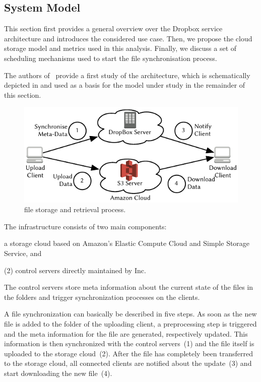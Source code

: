 \subsection{System Model}\label{sec:application:cloud_file_synchronisation:system_model}
This section first provides a general overview over the Dropbox service architecture and introduces the considered use case.
Then, we propose the cloud storage model and metrics used in this analysis.
Finally, we discuss a set of scheduling mechanisms used to start the file synchronisation process. 

The authors of~\cite{Drago2012} provide a first study of the \dropbox architecture, which is schematically depicted in  and used as a basis for the model under study in the remainder of this section.

\begin{figure}
  \centering
  \includegraphics[width=\columnwidth]{application/cloud_file_synchronization/system_model/figures/dropbox_architecture}
  \caption{\dropbox file storage and retrieval process.}
  \label{fig:application:cloud_file_synchronisation:system_model:dropbox_architecture}
\end{figure}

The \dropbox infrastructure consists of two main components:
\begin{enumerate*}
\item a storage cloud based on Amazon's Elastic Compute Cloud and Simple Storage Service, and 
\item (2) control servers directly maintained by \dropbox Inc. 
\end{enumerate*}
The control servers store meta information about the current state of the files in the \dropbox folders and trigger synchronization processes on the clients.

A file synchronization can basically be described in five steps.
As soon as the new file is added to the \dropbox folder of the uploading client, a preprocessing step is triggered and the meta information for the file are generated, respectively updated.
This information is then synchronized with the control servers~(1) and the file itself is uploaded to the storage cloud~(2).
After the file has completely been transferred to the storage cloud, all connected clients are notified about the update~(3) and start downloading the new file~(4).

